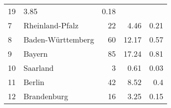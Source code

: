 \begin{longtable}{lXrrr}
       \num{19} &
       \num[round-mode=places,round-precision=2]{3,85} &
         \num[round-mode=places,round-precision=2]{0,18} \\

     7 &
     \multicolumn{1}{X}{ Rheinland-Pfalz   } &


       \num{22} &
       \num[round-mode=places,round-precision=2]{4,46} &
         \num[round-mode=places,round-precision=2]{0,21} \\

     8 &
     \multicolumn{1}{X}{ Baden-Württemberg   } &


       \num{60} &
       \num[round-mode=places,round-precision=2]{12,17} &
         \num[round-mode=places,round-precision=2]{0,57} \\

     9 &
     \multicolumn{1}{X}{ Bayern   } &


       \num{85} &
       \num[round-mode=places,round-precision=2]{17,24} &
         \num[round-mode=places,round-precision=2]{0,81} \\

     10 &
     \multicolumn{1}{X}{ Saarland   } &


       \num{3} &
       \num[round-mode=places,round-precision=2]{0,61} &
         \num[round-mode=places,round-precision=2]{0,03} \\

     11 &
     \multicolumn{1}{X}{ Berlin   } &


       \num{42} &
       \num[round-mode=places,round-precision=2]{8,52} &
         \num[round-mode=places,round-precision=2]{0,4} \\

     12 &
     \multicolumn{1}{X}{ Brandenburg   } &


       \num{16} &
       \num[round-mode=places,round-precision=2]{3,25} &
         \num[round-mode=places,round-precision=2]{0,15} \\


\end{longtable}
